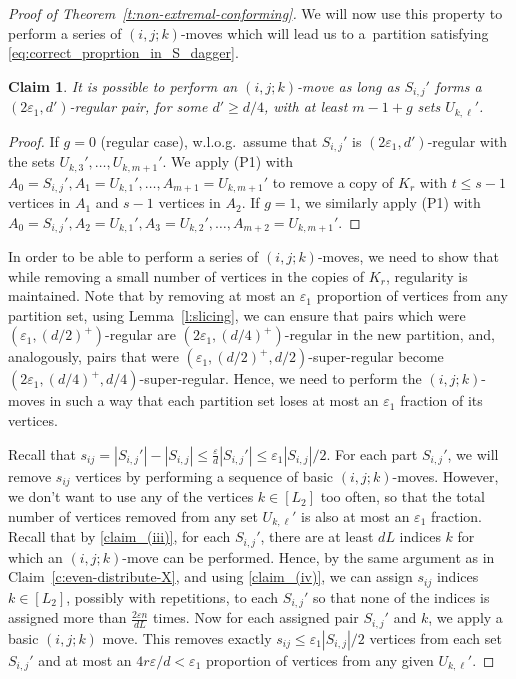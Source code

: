 \documentclass[reqno, 12pt]{amsart}
\numberwithin{equation}{section}
\numberwithin{figure}{section}
\theoremstyle{plain}
\newtheorem{claim}[thm]{Claim}
\theoremstyle{definition}
\let\eps=\varepsilon
\begin{document}
\begin{proof}[Proof of Theorem~\ref{t:non-extremal-conforming}]
    We will now use this property to perform a series of $(i,j;k)$-moves which will lead us to a~partition satisfying \eqref{eq:correct_proprtion_in_S_dagger}. 
        
    \begin{claim}
        It is possible to perform an $(i,j;k)$-move as long as $S_{i,j}'$ forms a $(2\eps_1, d')$-regular pair, for some $d'\geq d/4$, with at least $m-1+g$ sets $U_{k,\ell}'$.
    \end{claim} 
        
    \begin{proof}
        If $g=0$ (regular case), w.l.o.g.~assume that $S_{i,j}'$ is $(2\eps_1,d')$-regular with the sets $U_{k, 3}',\dots,U_{k,m+1}'$. We apply (P1) with $A_0=S_{i,j}', A_1=U_{k,1}', \ldots, A_{m+1}=U_{k,m+1}'$ to remove a copy of $K_r$ with $t\leq s-1$ vertices in $A_1$ and $s-1$ vertices in $A_2$. If $g=1$, we similarly apply (P1) with $A_0=S_{i,j}', A_2=U_{k,1}', A_3=U_{k,2}', \dots, A_{m+2}=U_{k,m+1}'$.
    \end{proof}

    In order to be able to perform a series of $(i,j;k)$-moves, we need to show that while removing a small number of vertices in the copies of $K_r$, regularity is maintained. Note that by removing at most an $\eps_1$ proportion of vertices from any partition set, using Lemma~\ref{l:slicing}, we can ensure that pairs which were $(\eps_1,(d/2)^+)$-regular are $(2\eps_1,(d/4)^+)$-regular in the new partition, and, analogously, pairs that were $(\eps_1,(d/2)^+,d/2)$-super-regular become $(2\eps_1,(d/4)^+,d/4)$-super-regular. Hence, we need to perform the $(i,j;k)$-moves in such a way that each partition set loses at most an $\eps_1$ fraction of its vertices.

    Recall that $s_{ij} = |S_{i,j}'|-|S_{i,j}| \leq \frac{\eps}{d}|S_{i,j}'| \leq \eps_1|S_{i,j}|/2$. For each part $S_{i,j}'$, we will remove $s_{ij}$ vertices by performing a sequence of basic $(i,j;k)$-moves. However, we don't want to use any of the vertices $k\in[L_2]$ too often, so that the total number of vertices removed from any set $U_{k,\ell}'$ is also at most an $\eps_1$ fraction. Recall that by \ref{claim_(iii)}, for each $S_{i,j}'$, there are at least $dL$ indices $k$ for which an $(i,j;k)$-move can be performed. Hence, by the same argument as in Claim~\ref{c:even-distribute-X}, and using \ref{claim_(iv)}, we can assign $s_{ij}$ indices $k\in[L_2]$, possibly with repetitions, to each $S_{i,j}'$ so that none of the indices is assigned more than $\frac{2\eps n}{dL}$ times. Now for each assigned pair $S_{i,j}'$ and $k$, we apply a basic $(i,j;k)$ move. This removes exactly $s_{ij}\leq \eps_1|S_{i,j}|/2$ vertices from each set $S_{i,j}'$ and at most an $4r\eps/d < \eps_1$ proportion of vertices from any given $U_{k,\ell}'$.
    

\end{proof}
\end{document}
